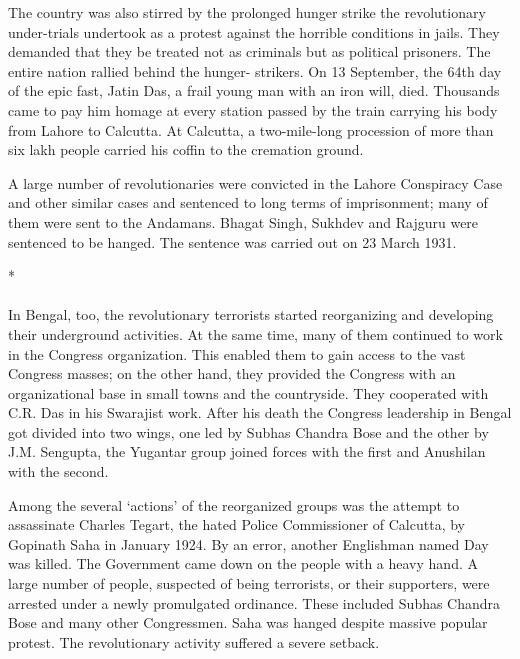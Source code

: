 The country was also stirred by the prolonged hunger strike the revolutionary under-trials undertook as a protest against the horrible conditions in jails. They demanded that they be treated not as criminals but as political prisoners. The entire nation rallied behind the hunger- strikers. On 13 September, the 64th day of the epic fast, Jatin Das, a frail young man with an iron will, died. Thousands came to pay him homage at every station passed by the train carrying his body from Lahore to Calcutta. At Calcutta, a two-mile-long procession of more than six lakh people carried his coffin to the cremation ground.

A large number of revolutionaries were convicted in the Lahore Conspiracy Case and other similar cases and sentenced to long terms of imprisonment; many of them were sent to the Andamans. Bhagat Singh, Sukhdev and Rajguru were sentenced to be hanged. The sentence was carried out on 23 March 1931.

\begin{center}*\end{center}

\paragraph*{}

In Bengal, too, the revolutionary terrorists started reorganizing and developing their underground activities. At the same time, many of them continued to work in the Congress organization. This enabled them to gain access to the vast Congress masses; on the other hand, they provided the Congress with an organizational base in small towns and the countryside. They cooperated with C.R. Das in his Swarajist work. After his death the Congress leadership in Bengal got divided into two wings, one led by Subhas Chandra Bose and the other by J.M. Sengupta, the Yugantar group joined forces with the first and Anushilan with the second.

Among the several `actions' of the reorganized groups was the attempt to assassinate Charles Tegart, the hated Police Commissioner of Calcutta, by Gopinath Saha in January 1924. By an error, another Englishman named Day was killed. The Government came down on the people with a heavy hand. A large number of people, suspected of being terrorists, or their supporters, were arrested under a newly promulgated ordinance. These included Subhas Chandra Bose and many other Congressmen. Saha was hanged despite massive popular protest. The revolutionary activity suffered a severe setback.

